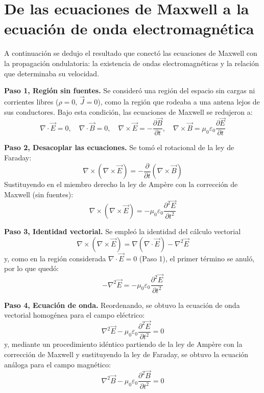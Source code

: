 \section{De las ecuaciones de Maxwell a la ecuación de onda electromagnética}
A continuación se dedujo el resultado que conectó las ecuaciones de Maxwell con la propagación ondulatoria: la existencia de ondas electromagnéticas y la relación que determinaba su velocidad.

\textbf{Paso 1, Región sin fuentes.} Se consideró una región del espacio sin cargas ni corrientes libres ($\rho = 0$, $\vec{J} = 0$), como la región que rodeaba a una antena lejos de sus conductores. Bajo esta condición, las ecuaciones de Maxwell se redujeron a:
\begin{equation}
    \nabla \cdot \vec{E} = 0, \quad \nabla \cdot \vec{B} = 0, \quad \nabla \times \vec{E} = -\frac{\partial \vec{B}}{\partial t}, \quad \nabla \times \vec{B} = \mu_0 \varepsilon_0 \frac{\partial \vec{E}}{\partial t}
\end{equation}

\textbf{Paso 2, Desacoplar las ecuaciones.} Se tomó el rotacional de la ley de Faraday:
\begin{equation}
    \nabla \times (\nabla \times \vec{E}) = -\frac{\partial}{\partial t} (\nabla \times \vec{B})
\end{equation}
Sustituyendo en el miembro derecho la ley de Ampère con la corrección de Maxwell (sin fuentes):
\begin{equation}
    \nabla \times (\nabla \times \vec{E}) = -\mu_0 \varepsilon_0 \frac{\partial^2 \vec{E}}{\partial t^2}
\end{equation}

\textbf{Paso 3, Identidad vectorial.} Se empleó la identidad del cálculo vectorial
\begin{equation}
    \nabla \times (\nabla \times \vec{E}) = \nabla(\nabla \cdot \vec{E}) - \nabla^2 \vec{E}
\end{equation}
y, como en la región considerada $\nabla \cdot \vec{E}=0$ (Paso 1), el primer término se anuló, por lo que quedó:
\begin{equation}
    -\nabla^2 \vec{E} = -\mu_0 \varepsilon_0 \frac{\partial^2 \vec{E}}{\partial t^2}
\end{equation}

\textbf{Paso 4, Ecuación de onda.} Reordenando, se obtuvo la ecuación de onda vectorial homogénea para el campo eléctrico:
\begin{equation}
    \nabla^2 \vec{E} - \mu_0 \varepsilon_0 \frac{\partial^2 \vec{E}}{\partial t^2} = 0
\end{equation}
y, mediante un procedimiento idéntico partiendo de la ley de Ampère con la corrección de Maxwell y sustituyendo la ley de Faraday, se obtuvo la ecuación análoga para el campo magnético:
\begin{equation}
    \nabla^2 \vec{B} - \mu_0 \varepsilon_0 \frac{\partial^2 \vec{B}}{\partial t^2} = 0
\end{equation}

